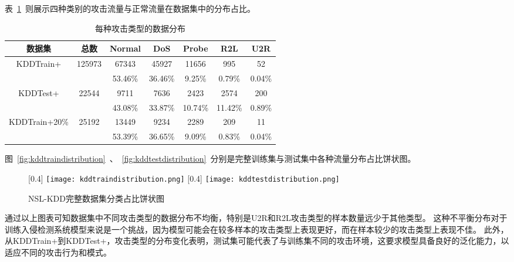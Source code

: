 表~\ref{tab:kdd_distribution}~则展示四种类别的攻击流量与正常流量在数据集中的分布占比。
\begin{table}[h]
	\caption{每种攻击类型的数据分布}
	\label{tab:kdd_distribution}
	\centering
	\begin{tabular}{ccccccc}
		\toprule
		\textbf{数据集}                   & \textbf{总数}             & \textbf{Normal} & \textbf{DoS} & \textbf{Probe} & \textbf{R2L} & \textbf{U2R} \\
		\midrule
		\multirow{2}{*}{KDDTrain+}     & \multirow{2}{*}{125973} & 67343           & 45927        & 11656          & 995          & 52           \\
		                               &                         & 53.46\%         & 36.46\%      & 9.25\%         & 0.79\%       & 0.04\%       \\
		\multirow{2}{*}{KDDTest+}      & \multirow{2}{*}{22544}  & 9711            & 7636         & 2423           & 2574         & 200          \\
		                               &                         & 43.08\%         & 33.87\%      & 10.74\%        & 11.42\%      & 0.89\%       \\
		\multirow{2}{*}{KDDTrain+20\%} & \multirow{2}{*}{25192}  & 13449           & 9234         & 2289           & 209          & 11           \\
		                               &                         & 53.39\%         & 36.65\%      & 9.09\%         & 0.83\%       & 0.04\%       \\
		\bottomrule
	\end{tabular}
\end{table}

图~\ref{fig:kddtraindistribution}~、~\ref{fig:kddtestdistribution}~分别是完整训练集与测试集中各种流量分布占比饼状图。
\begin{figure}[htbp]
	\centering
	[0.4\textwidth]{
		\texttt{[image: kddtraindistribution.png]}
	}
	\hspace{36pt}
	[0.4\textwidth]{
		\texttt{[image: kddtestdistribution.png]}
	}
	\caption{NSL-KDD完整数据集分类占比饼状图}
\end{figure}

通过以上图表可知数据集中不同攻击类型的数据分布不均衡，特别是U2R和R2L攻击类型的样本数量远少于其他类型。
这种不平衡分布对于训练入侵检测系统模型来说是一个挑战，因为模型可能会在较多样本的攻击类型上表现更好，而在样本较少的攻击类型上表现不佳。
此外，从KDDTrain+到KDDTest+，攻击类型的分布变化表明，测试集可能代表了与训练集不同的攻击环境，这要求模型具备良好的泛化能力，以适应不同的攻击行为和模式。\par

